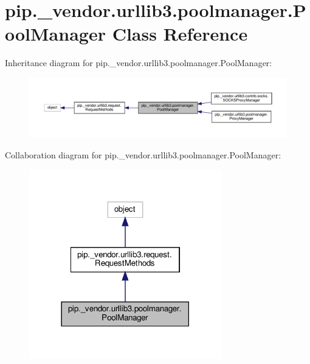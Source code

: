 \hypertarget{classpip_1_1__vendor_1_1urllib3_1_1poolmanager_1_1PoolManager}{}\section{pip.\+\_\+vendor.\+urllib3.\+poolmanager.\+Pool\+Manager Class Reference}
\label{classpip_1_1__vendor_1_1urllib3_1_1poolmanager_1_1PoolManager}


Inheritance diagram for pip.\+\_\+vendor.\+urllib3.\+poolmanager.\+Pool\+Manager\+:
\nopagebreak
\begin{figure}[H]
\begin{center}
\leavevmode
\includegraphics[width=350pt]{classpip_1_1__vendor_1_1urllib3_1_1poolmanager_1_1PoolManager__inherit__graph}
\end{center}
\end{figure}


Collaboration diagram for pip.\+\_\+vendor.\+urllib3.\+poolmanager.\+Pool\+Manager\+:
\nopagebreak
\begin{figure}[H]
\begin{center}
\leavevmode
\includegraphics[width=237pt]{classpip_1_1__vendor_1_1urllib3_1_1poolmanager_1_1PoolManager__coll__graph}
\end{center}
\end{figure}
